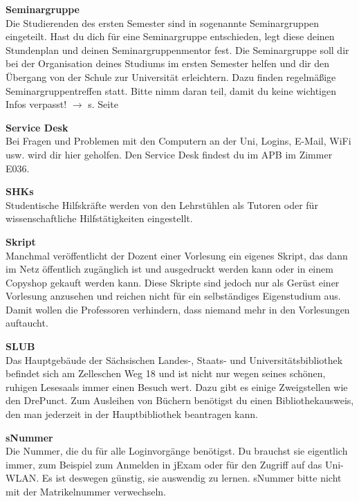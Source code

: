 \begin{multicols}{2}
\textbf{Seminargruppe} \\
Die Studierenden des ersten Semester sind in sogenannte Seminargruppen eingeteilt. Hast du dich für eine Seminargruppe entschieden, legt diese deinen Stundenplan und deinen Seminargruppenmentor fest. Die Se\-mi\-nar\-grup\-pe soll dir bei der Organisation deines Studiums im ersten Semester helfen und dir den Übergang von der Schule zur Universität erleichtern. Dazu finden regelmäßige Seminargruppentreffen statt. Bitte nimm daran teil, damit du keine wichtigen Infos verpasst!
$\rightarrow$ s. Seite \pageref{sec:seminargruppen}

\textbf{Service Desk} \\
Bei Fragen und Problemen mit den Computern an der Uni, Logins, E-Mail, WiFi usw. wird dir hier geholfen. Den Service Desk findest du im APB im Zimmer E036.

\textbf{SHKs} \\
Studentische Hilfskräfte werden von den Lehrstühlen als Tutoren oder für wissenschaftliche Hilfstätigkeiten eingestellt.

\textbf{Skript} \\
Manchmal veröffentlicht der Dozent einer Vorlesung ein eigenes Skript, das dann im Netz öffentlich zugänglich ist und ausgedruckt werden kann oder in einem Copyshop gekauft werden kann.
Diese Skripte sind jedoch nur als Gerüst einer Vorlesung anzusehen und reichen nicht für ein selbständiges Eigenstudium aus.
Damit wollen die Professoren verhindern, dass niemand mehr in den Vorlesungen auftaucht.

\textbf{SLUB} \\
Das Hauptgebäude der Sächsischen Landes-, Staats- und Universitätsbibliothek befindet sich am Zelleschen Weg 18 und ist nicht nur wegen seines schönen, ruhigen Lesesaals immer einen Besuch wert.
Dazu gibt es einige Zweigstellen wie den DrePunct.
Zum Ausleihen von Büchern benötigst du einen Bibliothekausweis, den man jederzeit in der Hauptbibliothek beantragen kann. 

\textbf{sNummer} \\
Die Nummer, die du für alle Loginvorgänge benötigst.
Du brauchst sie eigentlich immer, zum Beispiel zum Anmelden in jExam oder für den Zugriff auf das Uni-WLAN.
Es ist deswegen günstig, sie auswendig zu lernen.
sNummer bitte nicht mit der Matrikelnummer verwechseln.


\end{multicols}
